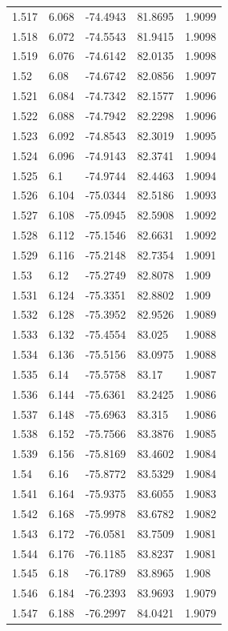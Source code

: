 \begin{tabular}{lllll}
1.517 & 6.068 & -74.4943 & 81.8695 & 1.9099 \\
1.518 & 6.072 & -74.5543 & 81.9415 & 1.9098 \\
1.519 & 6.076 & -74.6142 & 82.0135 & 1.9098 \\
1.52 & 6.08 & -74.6742 & 82.0856 & 1.9097 \\
1.521 & 6.084 & -74.7342 & 82.1577 & 1.9096 \\
1.522 & 6.088 & -74.7942 & 82.2298 & 1.9096 \\
1.523 & 6.092 & -74.8543 & 82.3019 & 1.9095 \\
1.524 & 6.096 & -74.9143 & 82.3741 & 1.9094 \\
1.525 & 6.1 & -74.9744 & 82.4463 & 1.9094 \\
1.526 & 6.104 & -75.0344 & 82.5186 & 1.9093 \\
1.527 & 6.108 & -75.0945 & 82.5908 & 1.9092 \\
1.528 & 6.112 & -75.1546 & 82.6631 & 1.9092 \\
1.529 & 6.116 & -75.2148 & 82.7354 & 1.9091 \\
1.53 & 6.12 & -75.2749 & 82.8078 & 1.909 \\
1.531 & 6.124 & -75.3351 & 82.8802 & 1.909 \\
1.532 & 6.128 & -75.3952 & 82.9526 & 1.9089 \\
1.533 & 6.132 & -75.4554 & 83.025 & 1.9088 \\
1.534 & 6.136 & -75.5156 & 83.0975 & 1.9088 \\
1.535 & 6.14 & -75.5758 & 83.17 & 1.9087 \\
1.536 & 6.144 & -75.6361 & 83.2425 & 1.9086 \\
1.537 & 6.148 & -75.6963 & 83.315 & 1.9086 \\
1.538 & 6.152 & -75.7566 & 83.3876 & 1.9085 \\
1.539 & 6.156 & -75.8169 & 83.4602 & 1.9084 \\
1.54 & 6.16 & -75.8772 & 83.5329 & 1.9084 \\
1.541 & 6.164 & -75.9375 & 83.6055 & 1.9083 \\
1.542 & 6.168 & -75.9978 & 83.6782 & 1.9082 \\
1.543 & 6.172 & -76.0581 & 83.7509 & 1.9081 \\
1.544 & 6.176 & -76.1185 & 83.8237 & 1.9081 \\
1.545 & 6.18 & -76.1789 & 83.8965 & 1.908 \\
1.546 & 6.184 & -76.2393 & 83.9693 & 1.9079 \\
1.547 & 6.188 & -76.2997 & 84.0421 & 1.9079 \\

\end{tabular}

